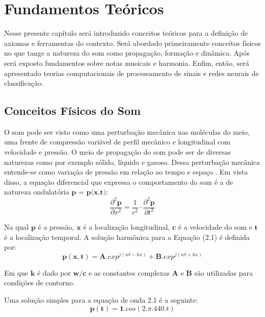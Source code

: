 \chapter{Fundamentos Teóricos}
\label{chap:fundamentosteoricos}

Nesse presente capítulo será introduzido conceitos teóricos para a definição de axiomas e ferramentas do contexto. Será abordado primeiramente conceitos físicos no que tange a natureza do som como propagação, formação e dinâmica. Após será exposto fundamentos sobre notas musicais e harmonia. Enfim, então, será apresentado teorias computacionais de processamento de sinais e redes neurais de classificação.

\section{Conceitos Físicos do Som}
\label{sec:conceitosfiscossom}

O som pode ser visto como uma perturbação mecânica nas moléculas do meio, uma frente de compressão variável  de perfil mecânico e longitudinal com velocidade e pressão. O meio de propagação do som pode ser de diversas naturezas como por exemplo sólido, líquido e gasoso. Dessa perturbação mecânica entende-se como variação de pressão em relação ao tempo e espaço \cite{portela2008caracterizaccao}. Em vista disso, a equação diferencial que expressa o comportamento do som é a de natureza ondulatória $\textbf{p = p(x,t)}$:
\begin{equation}
\label{eqn01}
	\frac{\partial^{2}\mathbf{p}}{\partial x^{2}} = \frac{1}{c^{2}}\cdot \frac{\partial^{2}\mathbf{p}}{\partial t^{2}}
\end{equation}

Na qual $\textbf{p}$ é a pressão, $\textbf{x}$ é a localização longitudinal, $\textbf{c}$ é a velocidade do som e $\textbf{t}$ é a localização temporal. A solução harmônica para a Equação (2.1) é definida por:
\begin{equation}
\label{eqn02}
	\mathbf{p(x,t)} = \mathbf{A}.{exp}^{j(wt - kx)} + \mathbf{B}.{exp}^{j(wt + kx)}
\end{equation}

Em que $\textbf{k}$ é dado por $\textbf{w}/\textbf{c}$ e as constantes complexas $\textbf{A}$ e $\textbf{B}$ são utilizadas para condições de contorno.

Uma solução simples para a equação de onda 2.1 é a seguinte:
\begin{equation}
\label{eqn03}
	\mathbf{p(t)} = \mathbf{1}.{cos}(2.\pi.440.t)
\end{equation}

